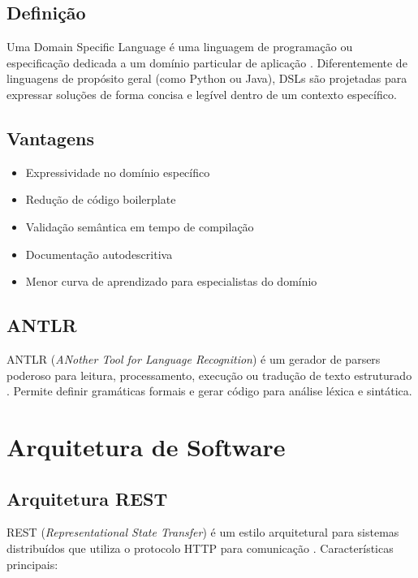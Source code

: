 \subsection{Definição}

Uma Domain Specific Language é uma linguagem de programação ou especificação dedicada a um domínio particular de aplicação \cite{fowler2010}. Diferentemente de linguagens de propósito geral (como Python ou Java), DSLs são projetadas para expressar soluções de forma concisa e legível dentro de um contexto específico.

\subsection{Vantagens}

\begin{itemize}
    \item Expressividade no domínio específico
    \item Redução de código boilerplate
    \item Validação semântica em tempo de compilação
    \item Documentação autodescritiva
    \item Menor curva de aprendizado para especialistas do domínio
\end{itemize}

\subsection{ANTLR}

ANTLR (\textit{ANother Tool for Language Recognition}) é um gerador de parsers poderoso para leitura, processamento, execução ou tradução de texto estruturado \cite{parr2013}. Permite definir gramáticas formais e gerar código para análise léxica e sintática.

\section{Arquitetura de Software}

\subsection{Arquitetura REST}

REST (\textit{Representational State Transfer}) é um estilo arquitetural para sistemas distribuídos que utiliza o protocolo HTTP para comunicação \cite{fielding2000}. Características principais:

